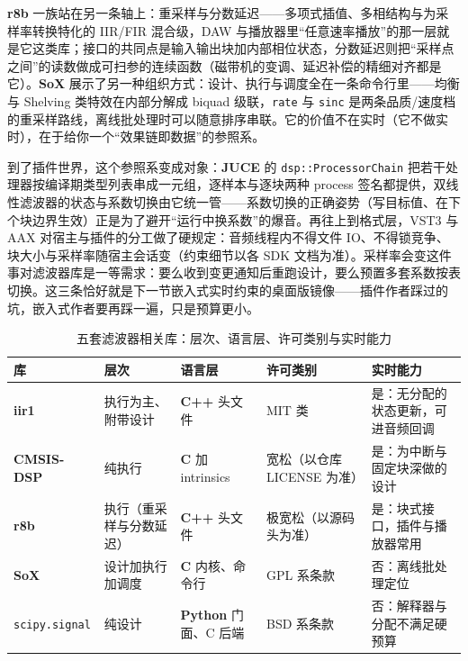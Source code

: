 \documentclass[12pt,a4paper,fontset=fandol]{ctexbook}
\newcommand{\Tp}[1]{\texttt{#1}}
\newcommand{\Lib}[1]{\textbf{#1}}
\newcommand{\Lang}[1]{\textsf{\bfseries #1}}
\newcommand{\CL}{\Lang{C}}
\newcommand{\CPP}{\Lang{C++}}
\newcommand{\PY}{\Lang{Python}}
\begin{document}
\Lib{r8b} 一族站在另一条轴上：重采样与分数延迟——多项式插值、多相结构与为采样率转换特化的 IIR/FIR 混合级，DAW 与播放器里``任意速率播放''的那一层就是它这类库；接口的共同点是输入输出块加内部相位状态，分数延迟则把``采样点之间''的读数做成可扫参的连续函数（磁带机的变调、延迟补偿的精细对齐都是它）。\Lib{SoX} 展示了另一种组织方式：设计、执行与调度全在一条命令行里——均衡与 Shelving 类特效在内部分解成 biquad 级联，\Tp{rate} 与 \Tp{sinc} 是两条品质/速度档的重采样路线，离线批处理时可以随意排序串联。它的价值不在实时（它不做实时），在于给你一个``效果链即数据''的参照系。

到了插件世界，这个参照系变成对象：\Lib{JUCE} 的 \Tp{dsp::ProcessorChain} 把若干处理器按编译期类型列表串成一元组，逐样本与逐块两种 process 签名都提供，双线性滤波器的状态与系数切换由它统一管——系数切换的正确姿势（写目标值、在下个块边界生效）正是为了避开``运行中换系数''的爆音。再往上到格式层，VST3 与 AAX 对宿主与插件的分工做了硬规定：音频线程内不得文件 IO、不得锁竞争、块大小与采样率随宿主会话变（约束细节以各 SDK 文档为准）。采样率会变这件事对滤波器库是一等需求：要么收到变更通知后重跑设计，要么预置多套系数按表切换。这三条恰好就是下一节嵌入式实时约束的桌面版镜像——插件作者踩过的坑，嵌入式作者要再踩一遍，只是预算更小。

\begin{table}[H]
\centering
\caption{五套滤波器相关库：层次、语言层、许可类别与实时能力}
\label{tab:ch13-filter}
\small
\begin{tabular}{@{}>{\raggedright\arraybackslash}p{}
  >{\raggedright\arraybackslash}p{}
  >{\raggedright\arraybackslash}p{}
  >{\raggedright\arraybackslash}p{}
  >{\raggedright\arraybackslash}p{}@{}}
\toprule
库 & 层次 & 语言层 & 许可类别 & 实时能力 \\
\midrule
\Lib{iir1} & 执行为主、附带设计 & \CPP{} 头文件 & MIT 类 &
  是：无分配的状态更新，可进音频回调 \\
\Lib{CMSIS-DSP} & 纯执行 & \CL{} 加 intrinsics & 宽松（以仓库 LICENSE 为准） &
  是：为中断与固定块深做的设计 \\
\Lib{r8b} & 执行（重采样与分数延迟） & \CPP{} 头文件 & 极宽松（以源码头为准） &
  是：块式接口，插件与播放器常用 \\
\Lib{SoX} & 设计加执行加调度 & \CL{} 内核、命令行 & GPL 系条款 &
  否：离线批处理定位 \\
\Tp{scipy.signal} & 纯设计 & \PY{} 门面、C 后端 & BSD 系条款 &
  否：解释器与分配不满足硬预算 \\
\bottomrule
\end{tabular}
\end{table}
\end{document}
